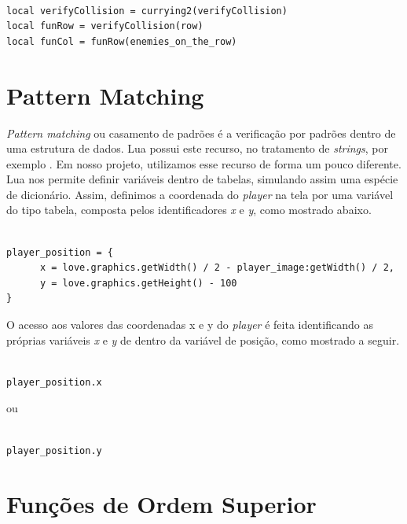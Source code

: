 \documentclass[rel_mlp]{iiufrgs}
\begin{document}
\begin{lstlisting}

local verifyCollision = currying2(verifyCollision)
local funRow = verifyCollision(row)
local funCol = funRow(enemies_on_the_row)

\end{lstlisting}

\section{Pattern Matching}

\textit{Pattern matching} ou casamento de padrões é a verificação por padrões dentro de uma estrutura de dados. Lua possui este recurso, no tratamento de \textit{strings}, por exemplo \cite{PatternMatchingLua}. Em nosso projeto, utilizamos esse recurso de forma um pouco diferente. Lua nos permite definir variáveis dentro de tabelas, simulando assim uma espécie de dicionário. Assim, definimos a coordenada do \textit{player} na tela por uma variável do tipo tabela, composta pelos identificadores \textit{x} e \textit{y}, como mostrado abaixo.

\begin{lstlisting}

player_position = {
      x = love.graphics.getWidth() / 2 - player_image:getWidth() / 2,
      y = love.graphics.getHeight() - 100
}

\end{lstlisting}

O acesso aos valores das coordenadas x e y do \textit{player} é feita identificando as próprias variáveis \textit{x} e \textit{y} de dentro da variável de posição, como mostrado a seguir.

\clearpage

\begin{lstlisting}

player_position.x

\end{lstlisting}

ou

\begin{lstlisting}

player_position.y

\end{lstlisting}



\section{Funções de Ordem Superior}
\end{document}
